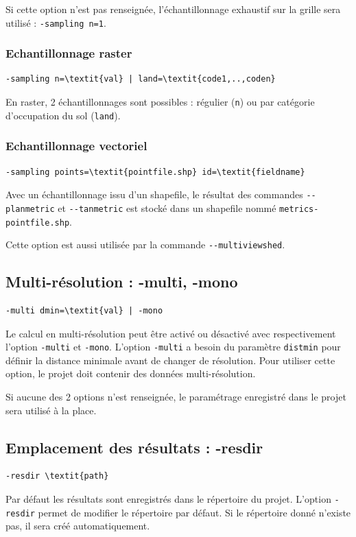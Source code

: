 \documentclass{report}
\begin{document}
Si cette option n'est pas renseignée, l'échantillonnage exhaustif sur la grille sera utilisé : \verb|-sampling n=1|.

\subsubsection{Echantillonnage raster}
\begin{Verbatim}[commandchars=\\\{\}]
-sampling n=\textit{val} | land=\textit{code1,..,coden}
\end{Verbatim}
En raster, 2 échantillonnages sont possibles : régulier (\verb|n|) ou par catégorie d'occupation du sol (\verb|land|).


\subsubsection{Echantillonnage vectoriel}
\begin{Verbatim}[commandchars=\\\{\}]
-sampling points=\textit{pointfile.shp} id=\textit{fieldname}
\end{Verbatim}
Avec un échantillonnage issu d'un shapefile, le résultat des commandes \verb|--planmetric| et \verb|--tanmetric| est stocké dans un shapefile nommé \verb|metrics-pointfile.shp|.

Cette option est aussi utilisée par la commande \verb|--multiviewshed|.


\subsection{Multi-résolution : -multi, -mono}
\begin{Verbatim}[commandchars=\\\{\}]
-multi dmin=\textit{val} | -mono
\end{Verbatim}

Le calcul en multi-résolution peut être activé ou désactivé avec respectivement l'option \verb|-multi| et \verb|-mono|. 
L'option \verb|-multi| a besoin du paramètre \verb|distmin| pour définir la distance minimale avant de changer de résolution. Pour utiliser cette option, le projet doit contenir des données multi-résolution. 

Si aucune des 2 options n'est renseignée, le paramétrage enregistré dans le projet sera utilisé à la place.

\subsection{Emplacement des résultats : -resdir}
\begin{Verbatim}[commandchars=\\\{\}]
-resdir \textit{path}
\end{Verbatim}
Par défaut les résultats sont enregistrés dans le répertoire du projet. L'option \verb|-resdir| permet de modifier le répertoire par défaut. 
Si le répertoire donné n'existe pas, il sera créé automatiquement.
\end{document}
